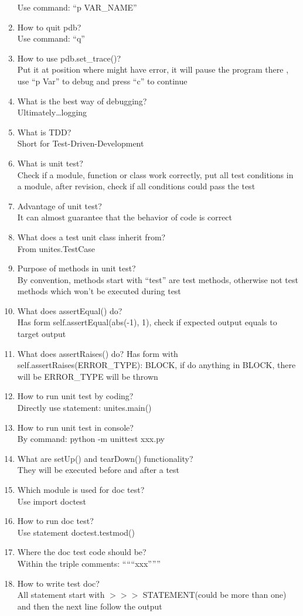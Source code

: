 \documentclass[10pt,a4paper,oneside]{article}
\begin{document}
\begin{enumerate}[1.]
Use command: ``p VAR\_NAME''
\item How to quit pdb?\\
Use command: ``q''
\item How to use pdb.set\_trace()?\\
Put it at position where might have error, it will pause the program there , use ``p Var'' to debug and press ``c'' to continue
\item What is the best way of debugging?\\
Ultimately\dots logging
\item What is TDD?\\
Short for Test-Driven-Development
\item What is unit test?\\
Check if a module, function or class work correctly, put all test conditions in a module, after revision, check if all conditions could pass the test
\item Advantage of unit test?\\
It can almost guarantee that the behavior of code is correct
\item What does a test unit class inherit from?\\
From unites.TestCase
\item Purpose of methods in unit test?\\
By convention, methods start with ``test'' are test methods, otherwise not test methods which won't be executed during test
\item What does assertEqual() do?\\
Has form self.assertEqual(abs(-1), 1), check if expected output equals to target output
\item What does assertRaises() do?
Has form with self.assertRaises(ERROR\_TYPE): BLOCK, if do anything in BLOCK, there will be ERROR\_TYPE will be thrown
\item How to run unit test by coding?\\
Directly use statement: unites.main()
\item How to run unit test in console?\\
By command: python -m unittest xxx.py
\item What are setUp() and tearDown() functionality?\\
They will be executed before and after a test
\item Which module is used for doc test?\\
Use import doctest
\item How to run doc test?\\
Use statement doctest.testmod()
\item Where the doc test code should be?\\
Within the triple comments: ``````xxx''''''
\item How to write test doc?\\
All statement start with $>>>$ STATEMENT(could be more than one) and then the next line follow the output
\end{enumerate}
\end{document}

